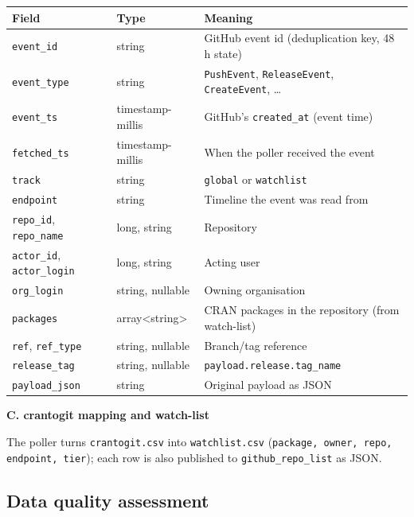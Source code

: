 \documentclass[11pt,a4paper]{article}
\newcommand{\hd}[1]{\par\Needspace{7\baselineskip}\medskip\noindent\textbf{#1}\par\nopagebreak\smallskip}
\begin{document}
\begin{center}
\centering\small
\begin{tabularx}{\textwidth}{@{}llY@{}}
\toprule
\textbf{Field} & \textbf{Type} & \textbf{Meaning} \\
\midrule
\texttt{event\_\allowbreak{}id} & string & GitHub event id (deduplication key, 48\,h state) \\
\texttt{event\_\allowbreak{}type} & string & \texttt{PushEvent}, \texttt{ReleaseEvent}, \texttt{CreateEvent}, \ldots \\
\texttt{event\_\allowbreak{}ts} & timestamp-millis & GitHub's \texttt{created\_\allowbreak{}at} (event time) \\
\texttt{fetched\_\allowbreak{}ts} & timestamp-millis & When the poller received the event \\
\texttt{track} & string & \texttt{global} or \texttt{watchlist} \\
\texttt{endpoint} & string & Timeline the event was read from \\
\texttt{repo\_\allowbreak{}id}, \texttt{repo\_\allowbreak{}name} & long, string & Repository \\
\texttt{actor\_\allowbreak{}id}, \texttt{actor\_\allowbreak{}login} & long, string & Acting user \\
\texttt{org\_\allowbreak{}login} & string, nullable & Owning organisation \\
\texttt{packages} & array<string> & CRAN packages in the repository (from watch-list) \\
\texttt{ref}, \texttt{ref\_\allowbreak{}type} & string, nullable & Branch/tag reference \\
\texttt{release\_\allowbreak{}tag} & string, nullable & \texttt{payload.release.tag\_\allowbreak{}name} \\
\texttt{payload\_\allowbreak{}json} & string & Original payload as JSON \\
\bottomrule
\end{tabularx}
\end{center}

\hd{C. crantogit mapping and watch-list} The poller turns \texttt{crantogit.csv} into
\texttt{watchlist.csv} (\texttt{package, owner, repo, endpoint, tier}); each row is also published to
\texttt{github\_\allowbreak{}repo\_\allowbreak{}list} as JSON.

\subsection{Data quality assessment}
\end{document}
